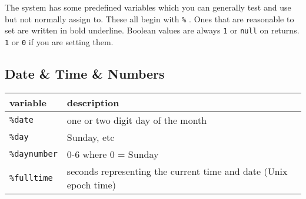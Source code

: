 \documentclass[]{article}
\begin{document}
The system has some predefined variables which you can generally test
and use but not normally assign to. These all begin with \texttt{\%} .
Ones that are reasonable to set are written in bold underline. Boolean
values are always \texttt{1} or \texttt{null} on returns. \texttt{1} or
\texttt{0} if you are setting them.

\subsection{Date \& Time \& Numbers}\label{date-time-numbers}

\begin{longtable}[]{@{}ll@{}}
\toprule
\begin{minipage}[b]{0.12\columnwidth}\raggedright\strut
variable\strut
\end{minipage} & \begin{minipage}[b]{0.61\columnwidth}\raggedright\strut
description\strut
\end{minipage}\tabularnewline
\midrule
\endhead
\begin{minipage}[t]{0.12\columnwidth}\raggedright\strut
\texttt{\%date}\strut
\end{minipage} & \begin{minipage}[t]{0.61\columnwidth}\raggedright\strut
one or two digit day of the month\strut
\end{minipage}\tabularnewline
\begin{minipage}[t]{0.12\columnwidth}\raggedright\strut
\texttt{\%day}\strut
\end{minipage} & \begin{minipage}[t]{0.61\columnwidth}\raggedright\strut
Sunday, etc\strut
\end{minipage}\tabularnewline
\begin{minipage}[t]{0.12\columnwidth}\raggedright\strut
\texttt{\%daynumber}\strut
\end{minipage} & \begin{minipage}[t]{0.61\columnwidth}\raggedright\strut
0-6 where 0 = Sunday\strut
\end{minipage}\tabularnewline
\begin{minipage}[t]{0.12\columnwidth}\raggedright\strut
\texttt{\%fulltime}\strut
\end{minipage} & \begin{minipage}[t]{0.61\columnwidth}\raggedright\strut
seconds representing the current time and date (Unix epoch time)\strut
\end{minipage}\tabularnewline

\end{longtable}
\end{document}
